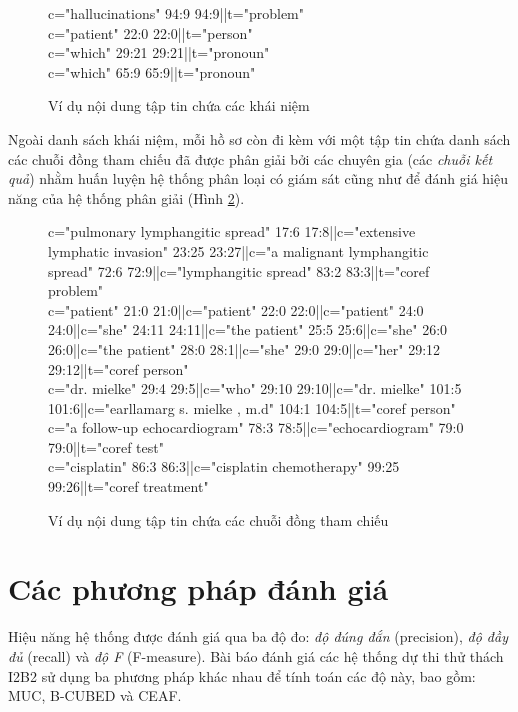 \begin{figure}[ht]
\begin{mdframed}
\ttfamily\footnotesize
\protect\raggedright
c="hallucinations" 94:9 94:9||t="problem"\\
c="patient" 22:0 22:0||t="person"\\
c="which" 29:21 29:21||t="pronoun"\\
c="which" 65:9 65:9||t="pronoun"
\end{mdframed}
\caption{Ví dụ nội dung tập tin chứa các khái niệm\label{con-eg}}
\end{figure}

Ngoài danh sách khái niệm, mỗi hồ sơ còn đi kèm với một tập tin chứa danh sách các chuỗi đồng tham chiếu đã được phân giải bởi các chuyên gia (các \emph{chuỗi kết quả}) nhằm huấn luyện hệ thống phân loại có giám sát cũng như để đánh giá hiệu năng của hệ thống phân giải (Hình \ref{chains-eg}).

\begin{figure}[ht]
\begin{mdframed}
\ttfamily\footnotesize
\protect\raggedright
c="pulmonary lymphangitic spread" 17:6 17:8||c="extensive lymphatic invasion" 23:25 23:27||c="a malignant lymphangitic spread" 72:6 72:9||c="lymphangitic spread" 83:2 83:3||t="coref problem"\\
c="patient" 21:0 21:0||c="patient" 22:0 22:0||c="patient" 24:0 24:0||c="she" 24:11 24:11||c="the patient" 25:5 25:6||c="she" 26:0 26:0||c="the patient" 28:0 28:1||c="she" 29:0 29:0||c="her" 29:12 29:12||t="coref person"\\
c="dr. mielke" 29:4 29:5||c="who" 29:10 29:10||c="dr. mielke" 101:5 101:6||c="earllamarg s. mielke , m.d" 104:1 104:5||t="coref person"\\
c="a follow-up echocardiogram" 78:3 78:5||c="echocardiogram" 79:0 79:0||t="coref test"\\
c="cisplatin" 86:3 86:3||c="cisplatin chemotherapy" 99:25 99:26||t="coref treatment"
\end{mdframed}
\caption{Ví dụ nội dung tập tin chứa các chuỗi đồng tham chiếu\label{chains-eg}}
\end{figure}

\section{Các phương pháp đánh giá}
Hiệu năng hệ thống được đánh giá qua ba độ đo: \emph{độ đúng đắn} (precision), \emph{độ đầy đủ} (recall) và \emph{độ F} (F-measure). Bài báo đánh giá các hệ thống dự thi thử thách I2B2 sử dụng ba phương pháp khác nhau để tính toán các độ này, bao gồm: MUC, B-CUBED và CEAF.


